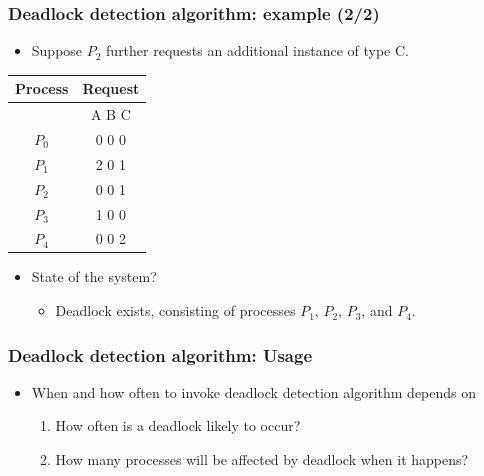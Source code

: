 \documentclass[CJKutf8,xcolor=pdftex,dvipsnames,table]{beamer}
\begin{document}
\begin{CJK*}{UTF8}{song}
  \begin{frame}
  \frametitle{Deadlock detection algorithm: example (2/2)} \pause
  \begin{itemize}
  \item{Suppose $P_2$ further requests an additional instance of type C.} \pause
  \end{itemize}
  \begin{tabular}{cc}
    Process & Request\\
    \hline
            & A B C\\
    $P_0$   & 0 0 0\\
    $P_1$   & 2 0 1\\
    $P_2$   & 0 0 1\\
    $P_3$   & 1 0 0\\
    $P_4$   & 0 0 2\\
  \end{tabular} \pause
  \begin{itemize}
  \item{State of the system?} \pause
    \begin{itemize}
    \item{Deadlock exists, consisting of processes $P_1$,  $P_2$, $P_3$, and $P_4$.}
    \end{itemize}
  \end{itemize}
  \end{frame}
  
  \begin{frame}
  \frametitle{Deadlock detection algorithm: Usage} \pause
  \begin{itemize}
  \item{When and how often to invoke deadlock detection algorithm depends on} \pause
    \begin{enumerate}
    \item{How often is a deadlock likely to occur?} \pause
    \item{How many processes will be affected by deadlock when it happens?}
    \end{enumerate}
  \end{itemize}
  \end{frame}
  

\end{CJK*}
\end{document}
